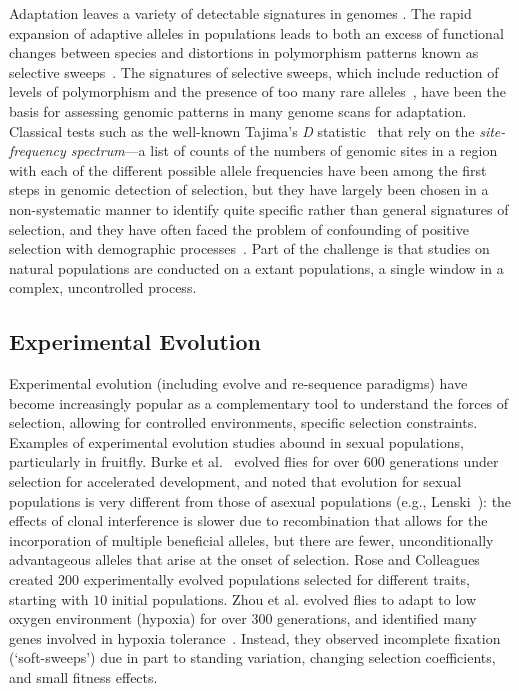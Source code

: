 \documentclass[11pt]{article}
\begin{document}
Adaptation leaves a variety of detectable signatures in
genomes \cite{nielsen2005genomic,akey2009constructing,
kreitman2000methods,messer2013population,sabeti2006positive}.
The rapid expansion of adaptive alleles in
populations leads to both an excess of functional changes between
species and distortions in polymorphism patterns known as selective
sweeps~\cite{nielsen2005genomic}. The signatures of selective sweeps, which
include reduction of levels of polymorphism and the presence of too
many rare alleles~\cite{nielsen2005genomic, przeworski2002signature}, have 
been the basis
for assessing genomic patterns in many genome scans for
adaptation. Classical tests such as the well-known Tajima's \emph{D}
statistic~\cite{tajima1989statistical} that rely on the \emph{site-frequency
  spectrum}---a list of counts of the numbers of genomic sites in a
region with each of the different possible allele frequencies have
been among the first steps in genomic detection of selection, but they
have largely been chosen in a non-systematic manner to identify quite
specific rather than general signatures of selection, and they have
often faced the problem of confounding of positive selection with
demographic processes~\cite{ptak2002evidence, ramos2002statistical}.
Part of the challenge is that studies on natural populations are
conducted on a extant populations, a single window in a complex,
uncontrolled process.

\subsection{Experimental Evolution}
\cite{Barrick2013Genome,Elena2003Evolution}
Experimental evolution (including evolve and re-sequence paradigms)
have become increasingly popular as a complementary tool to understand
the forces of selection, allowing for controlled environments,
specific selection constraints. Examples of experimental evolution
studies abound in sexual populations, particularly in fruitfly. Burke
et al.~\cite{Barrick2013Genome} evolved flies for over $600$ generations 
under
selection for accelerated development, and noted that evolution for
sexual populations is very different from those of asexual populations
(e.g., Lenski~\cite{}): the effects of clonal interference is slower
due to recombination that allows for the incorporation of multiple
beneficial alleles, but there are fewer, unconditionally advantageous
alleles that arise at the onset of selection. Rose and
Colleagues~\cite{rose1994evolutionary} created $200$ experimentally evolved
populations selected for different traits, starting with $10$ initial
populations. Zhou et al. evolved flies to adapt to low oxygen
environment (hypoxia) for over $300$ generations, and identified many
genes involved in hypoxia tolerance~\cite{zhou2011experimental}.  Instead, 
they observed
incomplete fixation (`soft-sweeps') due in part to standing variation,
changing selection coefficients, and small fitness effects.
\end{document}
